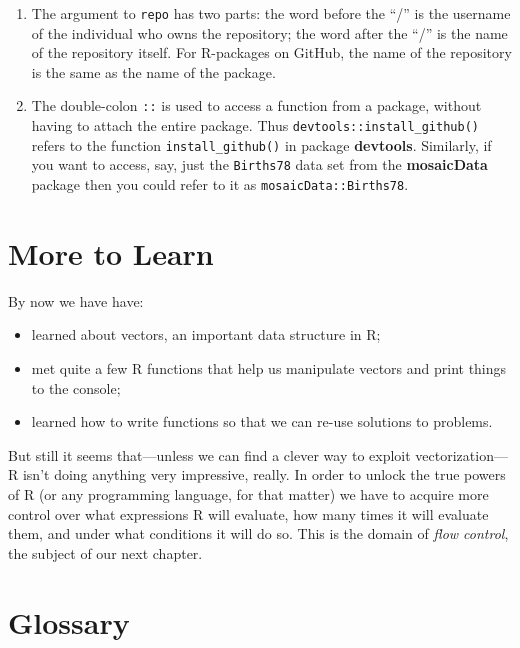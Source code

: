 \documentclass[]{book}
\providecommand{\tightlist}{%
  \setlength{\itemsep}{0pt}\setlength{\parskip}{0pt}}
\theoremstyle{definition}
\theoremstyle{definition}
\theoremstyle{definition}
\theoremstyle{remark}
\begin{document}
{\begin{enumerate}
\def\labelenumi{\arabic{enumi}.}
\tightlist
\item
  The argument to \texttt{repo} has two parts: the word before the ``/''
  is the username of the individual who owns the repository; the word
  after the ``/'' is the name of the repository itself. For R-packages
  on GitHub, the name of the repository is the same as the name of the
  package.
\item
  The double-colon \texttt{::} is used to access a function from a
  package, without having to attach the entire package. Thus
  \texttt{devtools::install\_github()} refers to the function
  \texttt{install\_github()} in package \textbf{devtools}. Similarly, if
  you want to access, say, just the \texttt{Births78} data set from the
  \textbf{mosaicData} package then you could refer to it as
  \texttt{mosaicData::Births78}.
\end{enumerate}

\section{More to Learn}\label{more-to-learn}

By now we have have:

\begin{itemize}
\tightlist
\item
  learned about vectors, an important data structure in R;
\item
  met quite a few R functions that help us manipulate vectors and print
  things to the console;
\item
  learned how to write functions so that we can re-use solutions to
  problems.
\end{itemize}

But still it seems that---unless we can find a clever way to exploit
vectorization---R isn't doing anything very impressive, really. In order
to unlock the true powers of R (or any programming language, for that
matter) we have to acquire more control over what expressions R will
evaluate, how many times it will evaluate them, and under what
conditions it will do so. This is the domain of \emph{flow control}, the
subject of our next chapter.

\newpage

\section*{Glossary}\label{glossary-1}

}
\end{document}
